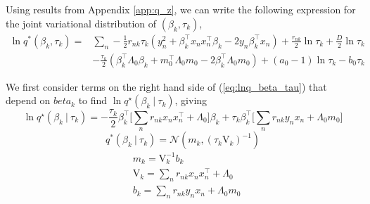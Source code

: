 \documentclass[twoside,11pt]{article}
\newcommand\given[1][]{\:#1\vert\:}
\newcommand{\transpose}[1]{#1^{\intercal}}
\begin{document}
\section{ } \label{app:beta_tau}  
Using results from Appendix \ref{app:q_z}, we can write the following expression for the joint variational distribution of $(\beta_k, \tau_k)$, 
\begin{equation} \label{eq:lnq_beta_tau}
\begin{split}
	\ln q^{*}(\beta_k, \tau_k) = & \sum_{n} -\frac{1}{2} r_{nk} \tau_k \left( y_n^2 + \transpose{\beta_k} x_n \transpose{x_n} \beta_k - 2y_n \transpose{\beta_k} x_n \right) + \frac{r_{nk}}{2} \ln \tau_k + \frac{D}{2} \ln \tau_k \\
	& - \frac{\tau_k}{2} \left( \transpose{\beta_k} \Lambda_0 \beta_k + \transpose{m_0} \Lambda_0 m_0 - 2\transpose{\beta_k}\Lambda_0m_0\right) + (a_0 - 1) \ln \tau_k - b_0 \tau_k
\end{split}
\end{equation}

We first consider terms on the right hand side of (\ref{eq:lnq_beta_tau}) that depend on $beta_k$ to find $\ln q^{\star}(\beta_k \given \tau_k)$, giving
\begin{equation} \label{eq:lnq_beta}
	\ln q^{\star}(\beta_k \given \tau_k) = -\frac{\tau_k}{2} \transpose{\beta_k} \Big[ \sum_{n}r_{nk} x_n \transpose{x_n} + \Lambda_0 \Big] \beta_k + \tau_k \transpose{\beta_k} \Big[ \sum_{n} r_{nk}y_n x_n + \Lambda_0 m_0 \Big]
\end{equation}
\begin{equation} \label{q_beta}
	q^{*}(\beta_k \given \tau_k) = \mathcal{N}\left(m_k, (\tau_k \mathrm{V}_k)^{-1} \right)
\end{equation}
\begin{equation} \label{eq:beta_params}
\begin{split}
	& m_k = \mathrm{V}_k^{-1}  b_k \\
 	& \mathrm{V}_k = \sum_{n} r_{nk} x_n \transpose{x_n} + \Lambda_0 \\
 	& b_k = \sum_{n} r_{nk} y_n x_n + \Lambda_0 m_0
\end{split}
\end{equation}
\end{document}
